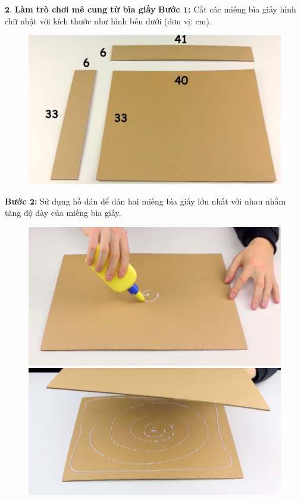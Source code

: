 \begin{multicols}{2}
	$\pmb{2.}$ \textbf{\color{toancuabi}Làm trò chơi mê cung từ bìa giấy}
	\vskip 0.1cm
	\textbf{\color{toancuabi}Bước $\pmb{1}$:} Cắt các miếng bìa giấy hình chữ nhật với kích thước như hình bên dưới (đơn vị: cm).
	\begin{figure}[H]
		\vspace*{-5pt}
		\centering
		\captionsetup{labelformat= empty, justification=centering}
		\includegraphics[width= 0.9\linewidth]{1}
		\vspace*{-10pt}
	\end{figure}
	\textbf{\color{toancuabi}Bước $\pmb{2}$:} Sử dụng hồ dán để dán hai miếng bìa giấy lớn nhất với nhau nhằm tăng độ dày của miếng bìa giấy.
	\begin{figure}[H]
		\vspace*{-5pt}
		\centering
		\captionsetup{labelformat= empty, justification=centering}
		\includegraphics[width=0.8\linewidth]{2}
		\includegraphics[width=0.8\linewidth]{3}

\end{figure}
\end{multicols}
